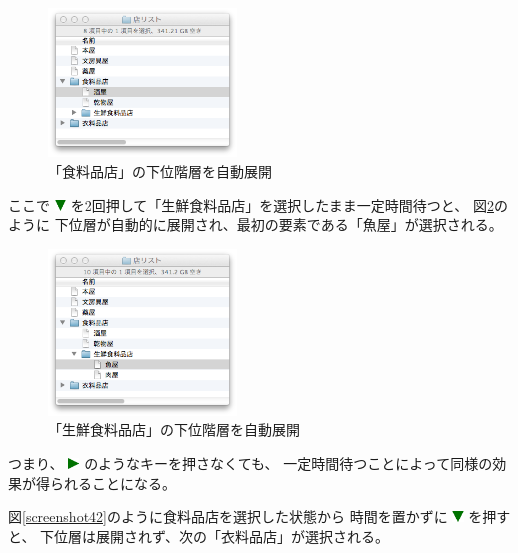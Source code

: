 \documentclass[twoside]{wiss}
\def\figwidth{50mm}
\def\down{ \includegraphics[width=3mm,bb=0 0 36 36]{figures/downtriangle.pdf} }
\def\right{ \includegraphics[width=3mm,bb=0 0 36 36]{figures/righttriangle.pdf} }
\begin{document}
\begin{figure}[H]
\centerline{\includegraphics[width=\figwidth,bb=0 0 344 272]{figures/2387e402f81dbe7917e04df82b0a659c.png}}
\caption{「食料品店」の下位階層を自動展開}
\label{screenshot7}
\end{figure}

\noindent
ここで{\down}を2回押して「生鮮食料品店」を選択したまま一定時間待つと、
図\ref{screenshot8}のように
下位層が自動的に展開され、最初の要素である「魚屋」が選択される。

\begin{figure}[H]
\centerline{\includegraphics[width=\figwidth,bb=0 0 344 304]{figures/1b1955309d3baefda8e1b614cf06df62.png}}
\caption{「生鮮食料品店」の下位階層を自動展開}
\label{screenshot8}
\end{figure}

\noindent
つまり、{\right}のようなキーを押さなくても、
一定時間待つことによって同様の効果が得られることになる。

図\ref{screenshot42}のように食料品店を選択した状態から
時間を置かずに{\down}を押すと、
下位層は展開されず、次の「衣料品店」が選択される。
\end{document}
